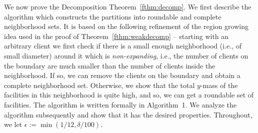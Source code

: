 %
%

\noindent
We now prove the Decomposition Theorem~\ref{fthm:decomp}. We first describe the algorithm which constructs the partitions into roundable and complete neighborhood sets. It is based on the following refinement of the region growing idea used in the proof of Theorem~\ref{fthm:weakdecomp} -- starting
with an arbitrary client we first check if there is a small enough neighborhood (i.e., of small diameter)  around it which is {\em non-expanding}, i.e., the number of clients on the boundary are much smaller than the number of clients inside the neighborhood. If so, we can remove the clients on the boundary and obtain a complete neighborhood set. Otherwise, we show that the total $y$-mass of the facilities in this neighborhood is quite high, and so, we can get
a roundable set of facilities.   The algorithm is written formally in Algorithm~1. We  analyze the algorithm subsequently  and show that it has the desired properties.
Throughout, we let $\epsilon := \min(1/12,\delta/100)$.

